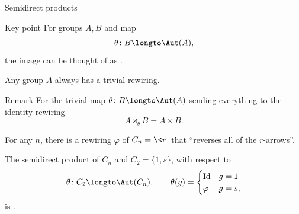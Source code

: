 \documentclass[8pt, handout]{beamer}
\newcommand{\Pause}{}
\begin{document}
\begin{frame}{Semidirect products} 

  \begin{alertblock}{Key point}
    For groups $A,B$ and map
    \[
    \theta\colon B\longto\Aut(A),
    \]
    the image  can be thought of as
    .
  \end{alertblock}

  \smallskip\Pause
  
  Any group $A$ always has a trivial rewiring.   \smallskip\Pause
  
  \begin{exampleblock}{Remark}
    For the trivial map $\theta\colon B\longto\Aut(A)$ sending
    everything to the identity rewiring
    \[
    A\rtimes_\theta B=A\times B.
    \]
  \end{exampleblock}

  \medskip\Pause
  
  For any $n$, there is a rewiring $\varphi$ of $C_n=\<r\>$ that ``reverses
  all of the $r$-arrows''. \medskip\Pause
    
  The semidirect product of $C_n$ and $C_2=\{1,s\}$, with respect
  to 
  \[
  \theta\colon
  C_2\longto\Aut(C_n),\qquad\theta(g)=\begin{cases}\text{Id} & g=1
  \\ \varphi & g=s, \end{cases}
  \]
  is .

\end{frame}

\end{document}
